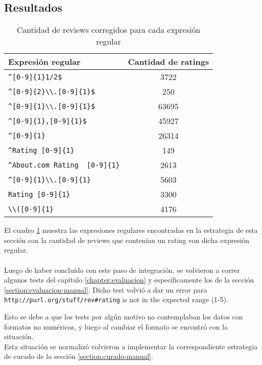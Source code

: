  \subsection*{Resultados}
 \begin{table}[h]
 \begin{tabular}{| l | c |}\hline
 Expresión regular & Cantidad de ratings \\\hline
 \verb|^[0-9]{1}1/2$| & 3722\\
 \verb|^[0-9]{2}\\.[0-9]{1}$| & 250\\
 \verb|^[0-9]{1}\\.[0-9]{1}$| & 63695\\
 \verb|^[0-9]{1},[0-9]{1}$| & 45927\\
 \verb|^[0-9]{1} | & 26314\\
 \verb|^Rating [0-9]{1}| & 149\\
 \verb|^About.com Rating  [0-9]{1}| & 2613\\
 \verb|^[0-9]{1}\\.[0-9]{1} | & 5603\\
 \verb|Rating [0-9]{1}| & 3300\\
 \verb|\\([0-9]{1} | & 4176 \\\hline
 \end{tabular}
 \caption{Cantidad de reviews corregidos para cada expresión regular}
\label{table:RegExpressionsRatingCorrected}
\end{table}
 El cuadro \ref{table:RegExpressionsRatingCorrected} muestra las expresiones regulares encontradas en la estrategia de esta sección con 
 la cantidad de reviews que contenían un rating con dicha expresión regular.
 \\\\
 Luego de haber concluído con este paso de integración, se volvieron a correr algunos tests del capítulo \ref{chapter:evaluacion} y 
 específicamente los de la sección \ref{section:evaluacion-manual}. Dicho test volvió a dar un error para 
 \verb |http://purl.org/stuff/rev#rating| is not in the expected range (1-5).
 
 Esto se debe a que los tests por algún motivo no contemplaban los datos con formatos no numéricos, y luego al cambiar el formato 
 se encontró con la situación.\\
 Esta situación se normalizó volvieron a implementar la correspondiente estrategia de curado de la sección \ref{section:curado-manual}.